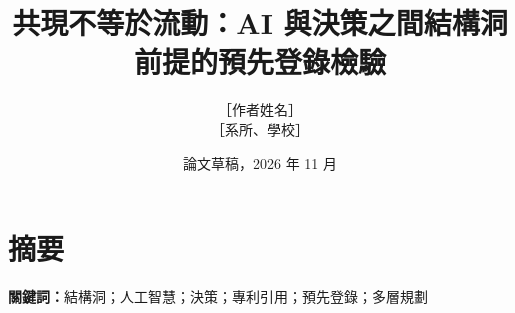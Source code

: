 \documentclass[12pt,a4paper,UTF8,fontset=none,openany]{ctexrep}
\title{共現不等於流動：AI 與決策之間結構洞前提的預先登錄檢驗}
\author{［作者姓名］\\［系所、學校］}
\date{論文草稿，2026 年 11 月}
\begin{document}
\maketitle
{}

\chapter*{摘要}


\noindent\textbf{關鍵詞：}結構洞；人工智慧；決策；專利引用；預先登錄；多層規劃

\tableofcontents
\listoffigures
\listoftables

\clearpage
{}










\appendix

\end{document}
